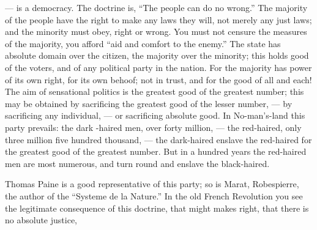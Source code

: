 \documentclass[12pt]{article}
\begin{document}
--- is a democracy. The doctrine is, ``The people can 
do no wrong.'' The majority of the people have the 
right to make any laws they will, not merely any just 
laws; and the minority must obey, right or wrong. 
You must not censure the measures of the majority, 
you afford ``aid and comfort to the enemy.'' The 
state has absolute domain over the citizen, the majority 
over the minority; this holds good of the voters, and 
of any political party in the nation. For the majority 
has power of its own right, for its own behoof; not 
in trust, and for the good of all and each! The aim 
of sensational politics is the greatest good of the greatest number; this may be obtained by sacrificing the 
greatest good of the lesser number, --- by sacrificing 
any individual, --- or sacrificing absolute good. In 
No-man's-land this party prevails: the dark -haired 
men, over forty million, --- the red-haired, only three 
million five hundred thousand, --- the dark-haired enslave the red-haired for the greatest good of the greatest number. But in a hundred years the red-haired 
men are most numerous, and turn round and enslave 
the black-haired. 

Thomas Paine is a good representative of this party; 
so is Marat, Robespierre, the author of the ``Systeme 
de la Nature.'' In the old French Revolution you 
see the legitimate consequence of this doctrine, that 
might makes right, that there is no absolute justice, 



\end{document}
